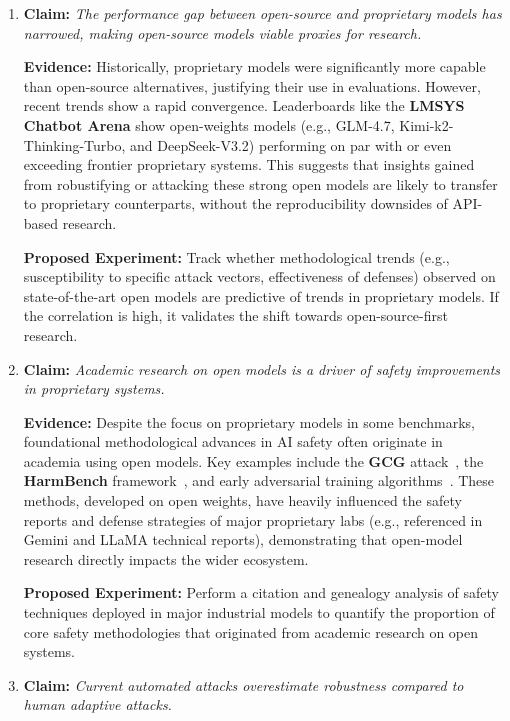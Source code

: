 \begin{enumerate}
    \item \textbf{Claim:} \textit{The performance gap between open-source and proprietary models has narrowed, making open-source models viable proxies for research.}
    
    \textbf{Evidence:} 
    Historically, proprietary models were significantly more capable than open-source alternatives, justifying their use in evaluations. However, recent trends show a rapid convergence. Leaderboards like the \textbf{LMSYS Chatbot Arena} show open-weights models (e.g., GLM-4.7, Kimi-k2-Thinking-Turbo, and DeepSeek-V3.2) performing on par with or even exceeding frontier proprietary systems. This suggests that insights gained from robustifying or attacking these strong open models are likely to transfer to proprietary counterparts, without the reproducibility downsides of API-based research. 
    
    \textbf{Proposed Experiment:} 
    Track whether methodological trends (e.g., susceptibility to specific attack vectors, effectiveness of defenses) observed on state-of-the-art open models are predictive of trends in proprietary models. If the correlation is high, it validates the shift towards open-source-first research.

    \item \textbf{Claim:} \textit{Academic research on open models is a driver of safety improvements in proprietary systems.}
    
    \textbf{Evidence:} 
    Despite the focus on proprietary models in some benchmarks, foundational methodological advances in AI safety often originate in academia using open models. Key examples include the \textbf{GCG} attack~\cite{zou2023universal}, the \textbf{HarmBench} framework~\cite{mazeika2024harmbench}, and early adversarial training algorithms~\cite{xhonneux2024efficient}. These methods, developed on open weights, have heavily influenced the safety reports and defense strategies of major proprietary labs (e.g., referenced in Gemini and LLaMA technical reports), demonstrating that open-model research directly impacts the wider ecosystem.
    
    \textbf{Proposed Experiment:} 
    Perform a citation and genealogy analysis of safety techniques deployed in major industrial models to quantify the proportion of core safety methodologies that originated from academic research on open systems.

    \item \textbf{Claim:} \textit{Current automated attacks overestimate robustness compared to human adaptive attacks.}
    

\end{enumerate}
